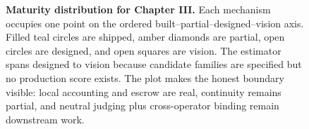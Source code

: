 \begin{figure}[H]
{}
\caption{\textbf{Maturity distribution for Chapter III.} Each mechanism occupies
one point on the ordered built--partial--designed--vision axis. Filled teal circles
are shipped, amber diamonds are partial, open circles are designed, and open
squares are vision. The estimator spans designed to vision because candidate
families are specified but no production score exists. The plot makes the honest
boundary visible: local accounting and escrow are real, continuity remains
partial, and neutral judging plus cross-operator binding remain downstream work.}
\label{fig:honest-state}
\end{figure}
